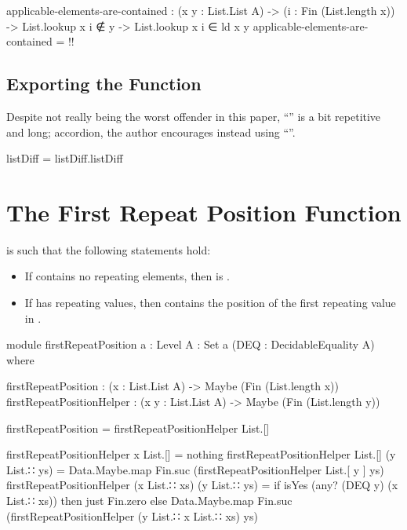 \documentclass{report}
\begin{document}
\begin{code}
    applicable-elements-are-contained :
      (x y : List.List A) ->
      (i : Fin (List.length x)) ->
      List.lookup x i ∉ y ->
      List.lookup x i ∈ ld x y
    applicable-elements-are-contained = {!!}
\end{code}

\subsection{Exporting the Function}
Despite not really being the worst offender in this paper, ``'' is a bit repetitive and long; accordion, the author encourages instead using ``''.

\begin{code}
listDiff = listDiff.listDiff
\end{code}

\section{The First Repeat Position Function}
 is such that the following statements hold:

\begin{itemize}
  \item If  contains no repeating elements, then    is .
  \item If  has repeating values, then    contains the position of the first repeating value in .
\end{itemize}

\begin{code}
module firstRepeatPosition
  {a : Level}
  {A : Set a}
  (DEQ : DecidableEquality A) where

  firstRepeatPosition : (x : List.List A) -> Maybe (Fin (List.length x))
  firstRepeatPositionHelper : (x y : List.List A) -> Maybe (Fin (List.length y))

  firstRepeatPosition = firstRepeatPositionHelper List.[]

  firstRepeatPositionHelper x List.[] = nothing
  firstRepeatPositionHelper List.[] (y List.∷ ys) =
    Data.Maybe.map Fin.suc (firstRepeatPositionHelper List.[ y ] ys)
  firstRepeatPositionHelper (x List.∷ xs) (y List.∷ ys) =
    if isYes (any? (DEQ y) (x List.∷ xs))
      then just Fin.zero
      else Data.Maybe.map Fin.suc (firstRepeatPositionHelper (y List.∷ x List.∷ xs) ys)
\end{code}
\end{document}
